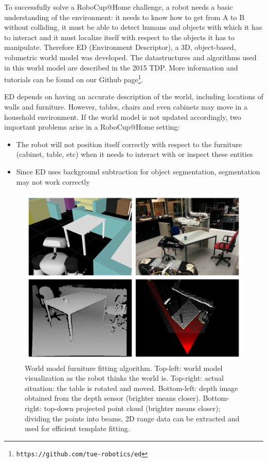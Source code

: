To successfully solve a RoboCup@Home challenge, a robot needs a basic understanding of the environment: it needs to know how to get from A to B without colliding, it must be able to detect humans and objects with which it has to interact and it must localize itself with respect to the objects it has to manipulate. Therefore ED (Environment Descriptor), a 3D, object-based, volumetric world model was developed. The datastructures and algorithms used in this world model are described in the 2015 TDP. More information and tutorials can be found on our Github page\footnote{\texttt{https://github.com/tue-robotics/ed}}.

ED depends on having an accurate description of the world, including locations of walls and furniture. However, tables, chairs and even cabinets may move in a household environment. If the world model is not updated accordingly, two important problems arise in a RoboCup@Home setting:
\begin{itemize}
    \item The robot will not position itself correctly with respect to the furniture (cabinet, table, etc) when it needs to interact with or inspect these entities
    \item Since ED uses background subtraction for object segmentation, segmentation may not work correctly
\end{itemize}

\begin{figure}[ht]
        \includegraphics[width = \linewidth]{Figures/fitting}
        \caption{World model furniture fitting algorithm. Top-left: world model visualization as the robot thinks the world is. Top-right: actual situation: the table is rotated and moved. Bottom-left: depth image obtained from the depth sensor (brighter means closer). Bottom-right: top-down projected point cloud (brighter means closer); dividing the points into beams, 2D range data can be extracted and used for efficient template fitting.}
        \label{fig:fitting}
\end{figure}

